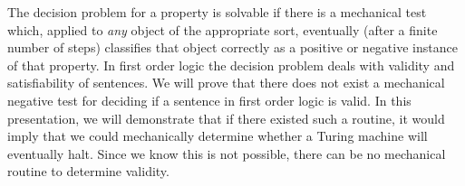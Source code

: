 The decision problem for a property is solvable if there is a mechanical test which, applied to \textit{any} object of the appropriate sort, eventually (after a finite number of steps) classifies that object correctly as a positive or negative instance of that property. In first order logic the decision problem deals with validity and satisfiability of sentences. We will prove that there does not exist a mechanical negative test for deciding if a sentence in first order logic is valid. In this presentation, we will demonstrate that if there existed such a routine, it would imply that we could mechanically determine whether a Turing machine will eventually halt. Since we know this is not possible, there can be no mechanical routine to determine validity.
